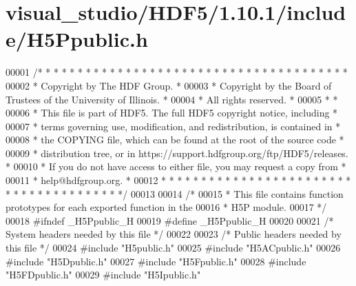 \hypertarget{visual__studio_2_h_d_f5_21_810_81_2include_2_h5_ppublic_8h_source}{}\section{visual\+\_\+studio/\+H\+D\+F5/1.10.1/include/\+H5\+Ppublic.h}
\label{visual__studio_2_h_d_f5_21_810_81_2include_2_h5_ppublic_8h_source}

\begin{DoxyCode}
00001 \textcolor{comment}{/* * * * * * * * * * * * * * * * * * * * * * * * * * * * * * * * * * * * * * *}
00002 \textcolor{comment}{ * Copyright by The HDF Group.                                               *}
00003 \textcolor{comment}{ * Copyright by the Board of Trustees of the University of Illinois.         *}
00004 \textcolor{comment}{ * All rights reserved.                                                      *}
00005 \textcolor{comment}{ *                                                                           *}
00006 \textcolor{comment}{ * This file is part of HDF5.  The full HDF5 copyright notice, including     *}
00007 \textcolor{comment}{ * terms governing use, modification, and redistribution, is contained in    *}
00008 \textcolor{comment}{ * the COPYING file, which can be found at the root of the source code       *}
00009 \textcolor{comment}{ * distribution tree, or in https://support.hdfgroup.org/ftp/HDF5/releases.  *}
00010 \textcolor{comment}{ * If you do not have access to either file, you may request a copy from     *}
00011 \textcolor{comment}{ * help@hdfgroup.org.                                                        *}
00012 \textcolor{comment}{ * * * * * * * * * * * * * * * * * * * * * * * * * * * * * * * * * * * * * * */}
00013 
00014 \textcolor{comment}{/*}
00015 \textcolor{comment}{ * This file contains function prototypes for each exported function in the}
00016 \textcolor{comment}{ * H5P module.}
00017 \textcolor{comment}{ */}
00018 \textcolor{preprocessor}{#ifndef \_H5Ppublic\_H}
00019 \textcolor{preprocessor}{#define \_H5Ppublic\_H}
00020 
00021 \textcolor{comment}{/* System headers needed by this file */}
00022 
00023 \textcolor{comment}{/* Public headers needed by this file */}
00024 \textcolor{preprocessor}{#include "H5public.h"}
00025 \textcolor{preprocessor}{#include "H5ACpublic.h"}
00026 \textcolor{preprocessor}{#include "H5Dpublic.h"}
00027 \textcolor{preprocessor}{#include "H5Fpublic.h"}
00028 \textcolor{preprocessor}{#include "H5FDpublic.h"}
00029 \textcolor{preprocessor}{#include "H5Ipublic.h"}

\end{DoxyCode}
